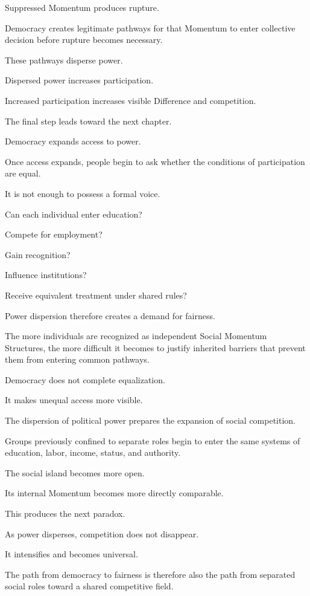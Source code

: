 Suppressed Momentum produces rupture.

Democracy creates legitimate pathways for that Momentum to enter collective decision before rupture becomes necessary.

These pathways disperse power.

Dispersed power increases participation.

Increased participation increases visible Difference and competition.

The final step leads toward the next chapter.

Democracy expands access to power.

Once access expands, people begin to ask whether the conditions of participation are equal.

It is not enough to possess a formal voice.

Can each individual enter education?

Compete for employment?

Gain recognition?

Influence institutions?

Receive equivalent treatment under shared rules?

Power dispersion therefore creates a demand for fairness.

The more individuals are recognized as independent Social Momentum Structures, the more difficult it becomes to justify inherited barriers that prevent them from entering common pathways.

Democracy does not complete equalization.

It makes unequal access more visible.

The dispersion of political power prepares the expansion of social competition.

Groups previously confined to separate roles begin to enter the same systems of education, labor, income, status, and authority.

The social island becomes more open.

Its internal Momentum becomes more directly comparable.

This produces the next paradox.

As power disperses, competition does not disappear.

It intensifies and becomes universal.

The path from democracy to fairness is therefore also the path from separated social roles toward a shared competitive field.


